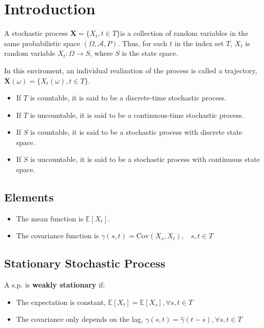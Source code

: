 \section{Introduction}
A stochastic process $\bm{X}=\{X_t, t\in T\}$is a collection of random variables
in the same probabilistic space $(\Omega, \bm{\mathcal{A}}, P)$. Thus, for each
$t$ in the index set $T$, $X_t$ is random variable $X_t: \Omega\rightarrow S$,
where $S$ is the state space.

In this enviroment, an individual realization of the process is called a
trajectory, $\bm{X}(\omega) = \{ X_t(\omega), t \in T \}$.

\begin{itemize}
    \item If $T$ is countable, it is said to be a discrete-time stochastic
    process.
    \item If $T$ is uncountable, it is said to be a continuous-time stochastic
    process.
    \item If $S$ is countable, it is said to be a stochastic process with
    discrete state space.
    \item If $S$ is uncountable, it is said to be a stochastic process with
    continuous state space.
\end{itemize}

\subsection{Elements}
\begin{itemize}
    \item The mean function is $\mathbb{E}[X_t]$.
    \item The covariance function is $\gamma(s,t) = \text{Cov}(X_s,X_t),\;\;\;
    s,t \in T$
\end{itemize}

\subsection{Stationary Stochastic Process}
A s.p. is \textbf{weakly stationary} if:
\begin{itemize}
    \item The expectation is constant, $\mathbb{E}[X_t] = \mathbb{E}[X_s],
    \forall s,t \in T$
    \item The covariance only depends on the lag, $\gamma(s,t) =
    \overset{\sim}{\gamma}(t-s), \forall s,t \in T$
\end{itemize} 

